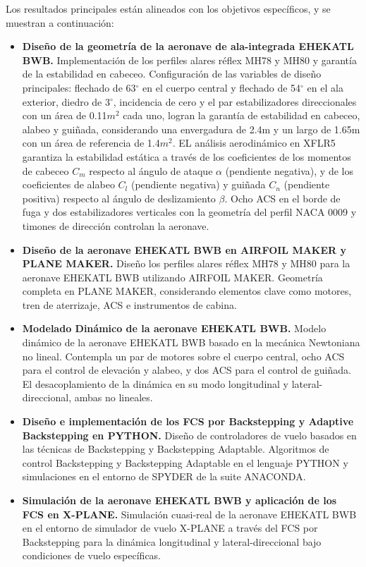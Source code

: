 Los resultados principales están alineados con los objetivos específicos, y se muestran a continuación: 
\begin{itemize}
    \item[R1] \textbf{Diseño de la geometría de la aeronave de ala-integrada EHEKATL BWB.} Implementación de los perfiles alares réflex MH78 y MH80 
 y garantía de la estabilidad en cabeceo. Configuración de las variables de diseño principales: flechado de 63$^\circ$ en el cuerpo central y flechado de 54$^\circ$ en el ala exterior, diedro de 3$^\circ$, incidencia de cero y el par estabilizadores direccionales con un área de 0.11$m^2$ cada uno, logran la garantía de estabilidad en cabeceo, alabeo y guiñada, considerando una envergadura de 2.4m y un largo de 1.65m con un área de referencia de 1.4$m^2$. EL análisis aerodinámico en XFLR5 garantiza la estabilidad estática a través de los coeficientes de los momentos de cabeceo $C_m$ respecto al ángulo de ataque $\alpha$ (pendiente negativa), y de los coeficientes de alabeo $C_l$ (pendiente negativa) y guiñada $C_n$ (pendiente positiva) respecto al ángulo de deslizamiento $\beta$.
 Ocho ACS en el borde de fuga y dos estabilizadores verticales con la geometría del perfil NACA 0009 y timones de dirección controlan la aeronave.
    \item[R2] \textbf{Diseño de la aeronave EHEKATL BWB en AIRFOIL MAKER y PLANE MAKER.} Diseño los perfiles alares réflex MH78 y MH80 para la aeronave EHEKATL BWB utilizando AIRFOIL MAKER. Geometría completa en PLANE MAKER, considerando elementos clave como motores, tren de aterrizaje, ACS e instrumentos de cabina.
    \item[R3] \textbf{Modelado Dinámico de la aeronave EHEKATL BWB.} Modelo dinámico de la aeronave EHEKATL BWB basado en la mecánica Newtoniana no lineal. Contempla un par de motores sobre el cuerpo central, ocho ACS para el control de elevación y alabeo, y dos ACS para el control de guiñada. El desacoplamiento de la dinámica en su modo longitudinal y lateral-direccional, ambas no lineales.
    \item[R4] \textbf{Diseño e implementación de los FCS por Backstepping y Adaptive Backstepping en PYTHON.} Diseño de controladores de vuelo basados en las técnicas de Backstepping y Backstepping Adaptable.
    Algoritmos de control Backstepping y Backstepping Adaptable en el lenguaje PYTHON y simulaciones en el entorno de SPYDER de la suite ANACONDA. 
    \item[R5] \textbf{Simulación de la aeronave EHEKATL BWB y aplicación de los FCS en X-PLANE.} Simulación cuasi-real de la aeronave EHEKATL BWB en el entorno de simulador de vuelo X-PLANE a través del FCS por Backstepping para la dinámica longitudinal y lateral-direccional bajo condiciones de vuelo específicas. 
\end{itemize}

